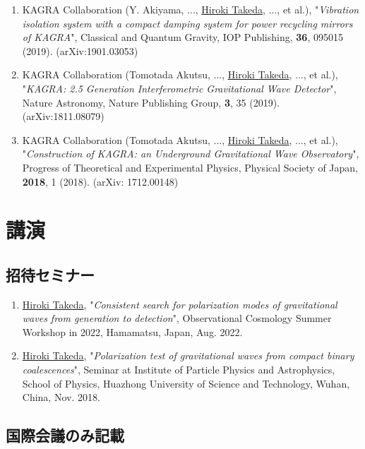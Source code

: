 \documentclass[uplatex, 11pt]{jsarticle}
\begin{document}
\begin{enumerate}
\item KAGRA Collaboration (Y. Akiyama, ..., \uline{Hiroki Takeda}, ..., et al.), "\emph{Vibration isolation system with a compact damping system for power recycling mirrors of KAGRA}", Classical and Quantum Gravity, IOP Publishing, {\bf 36}, 095015 (2019). (arXiv:1901.03053)\\

\item KAGRA Collaboration (Tomotada Akutsu, ..., \uline{Hiroki Takeda}, ..., et al.), "\emph{KAGRA: 2.5 Generation Interferometric Gravitational Wave Detector}", Nature Astronomy, Nature Publishing Group, {\bf 3}, 35 (2019). (arXiv:1811.08079)\\

\item KAGRA Collaboration (Tomotada Akutsu, ..., \uline{Hiroki Takeda}, ..., et al.), "\emph{Construction of KAGRA: an Underground Gravitational Wave Observatory}", Progress of Theoretical and Experimental Physics, Physical Society of Japan, {\bf 2018}, 1 (2018). (arXiv: 1712.00148)

\end{enumerate}


\section*{講演}
\subsection*{招待セミナー}
\begin{enumerate}
\item \uline{Hiroki Takeda}, "\emph{Consistent search for polarization modes of gravitational waves from generation to detection}", Observational Cosmology Summer Workshop in 2022,  Hamamatsu, Japan, Aug. 2022.\\

\item \uline{Hiroki Takeda}, "\emph{Polarization test of gravitational waves from compact binary coalescences}", Seminar at Institute of Particle Physics and Astrophysics, School of Physics, Huazhong University of Science and Technology, Wuhan, China, Nov. 2018.\\
\end{enumerate}

\subsection*{国際会議のみ記載}
\end{document}
